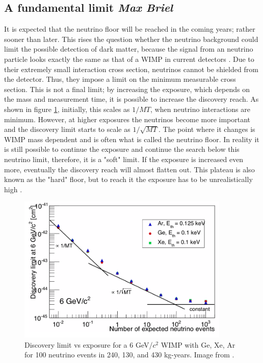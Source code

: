 \documentclass{article}
\begin{document}
\subsection{A fundamental limit \small{\textit{Max Briel}}}

It is expected that the neutrino floor will be reached in the coming years; rather sooner than later. This rises the question whether the neutrino background could limit the possible detection of dark matter, because the signal from an neutrino particle looks exactly the same as that of a WIMP in current detectors \cite{Gutlein:2010tq,Billard:2013qya}. Due to their extremely small interaction cross section, neutrinos cannot be shielded from the detector. Thus, they impose a limit on the minimum measurable cross section. This is not a final limit; by increasing the exposure, which depends on the mass and measurement time, it is possible to increase the discovery reach. As shown in figure \ref{discovery_limit}, initially, this scales as $1/MT$, when neutrino interactions are minimum. However, at higher exposures the neutrinos become more important and the discovery limit starts to scale as $1/\sqrt{MT}$. The point where it changes is WIMP mass dependent and is often what is called the neutrino floor. In reality it is still possible to continue the exposure and continue the search below this neutrino limit, therefore, it is a "soft" limit. If the exposure is increased even more, eventually the discovery reach will almost flatten out. This plateau is also known as the "hard" floor, but to reach it the exposure has to be unrealistically high \cite{Wyenberg:2018eyv}. 

\begin{figure}[h!]
    \centering
    \includegraphics[width=0.9\textwidth]{Discovery_limit.png}
    \caption{Discovery limit vs exposure for a 6 GeV/$c^2$ WIMP with Ge, Xe, Ar for 100 neutrino events in 240, 130, and 430 kg-years. Image from \cite{Billard:2013qya}.}
    \label{discovery_limit}
\end{figure}
\end{document}
